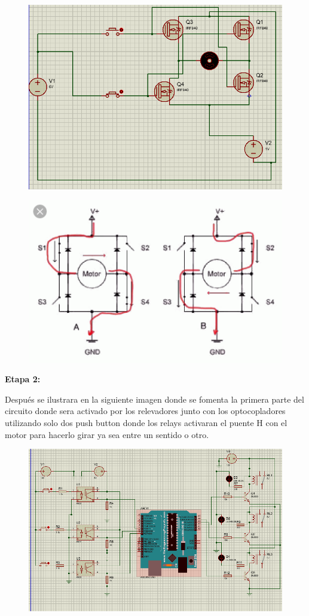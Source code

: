 \documentclass[10pt,a4paper]{article}
\begin{document}
\begin{figure}[hbtp]
\includegraphics[scale=0.5]{2.png} 
\centering
\end{figure}
\begin{figure}[hbtp]
\includegraphics[scale=0.8]{8.png} 
\centering
\end{figure}
\textbf{Etapa 2:}

Después se ilustrara en la siguiente imagen donde se fomenta la primera parte del circuito donde sera activado por los relevadores junto con los optocopladores utilizando solo dos push button donde los relays activaran el puente H con el motor para hacerlo girar ya sea entre un sentido o otro.

\begin{figure}[hbtp]
\includegraphics[scale=0.5]{3.png} 
\centering
\end{figure}
\end{document}
